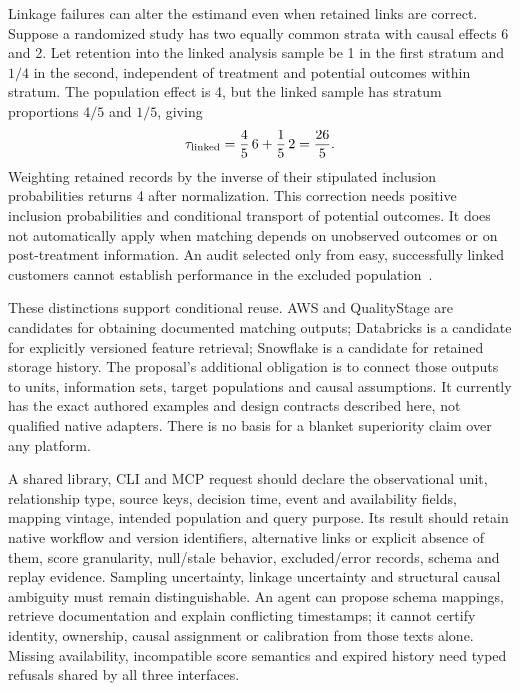 Linkage failures can alter the estimand even when retained links are correct.
Suppose a randomized study has two equally common strata with causal effects 6
and 2. Let retention into the linked analysis sample be 1 in the first stratum
and $1/4$ in the second, independent of treatment and potential outcomes within
stratum. The population effect is 4, but the linked sample has stratum proportions
$4/5$ and $1/5$, giving
\begin{equation}
 \tau_{\rm linked}=\frac45\,6+\frac15\,2=\frac{26}{5}.
 \label{exec22:obs-inclusion}
\end{equation}
Weighting retained records by the inverse of their stipulated inclusion
probabilities returns 4 after normalization. This correction needs positive
inclusion probabilities and conditional transport of potential outcomes. It does
not automatically apply when matching depends on unobserved outcomes or on
post-treatment information. An audit selected only from easy, successfully linked
customers cannot establish performance in the excluded population~\citep{exec22_obs_reference}.

These distinctions support conditional reuse. AWS and QualityStage are candidates
for obtaining documented matching outputs; Databricks is a candidate for explicitly
versioned feature retrieval; Snowflake is a candidate for retained storage history.
The proposal's additional obligation is to connect those outputs to units,
information sets, target populations and causal assumptions. It currently has the
exact authored examples and design contracts described here, not qualified native
adapters. There is no basis for a blanket superiority claim over any platform.

A shared library, CLI and MCP request should declare the observational unit,
relationship type, source keys, decision time, event and availability fields,
mapping vintage, intended population and query purpose. Its result should retain
native workflow and version identifiers, alternative links or explicit absence of
them, score granularity, null/stale behavior, excluded/error records, schema and
replay evidence. Sampling uncertainty, linkage uncertainty and structural causal
ambiguity must remain distinguishable. An agent can propose schema mappings,
retrieve documentation and explain conflicting timestamps; it cannot certify
identity, ownership, causal assignment or calibration from those texts alone.
Missing availability, incompatible score semantics and expired history need typed
refusals shared by all three interfaces.

